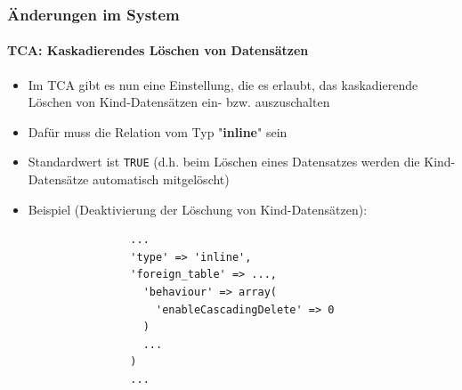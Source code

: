 
\begin{frame}[fragile]
	\frametitle{Änderungen im System}
	\framesubtitle{TCA: Kaskadierendes Löschen von Datensätzen}

	\lstset{
		basicstyle=\tiny\ttfamily
	}

	\begin{itemize}
		\item Im TCA gibt es nun eine Einstellung, die es erlaubt, das kaskadierende Löschen von Kind-Datensätzen
ein- bzw. auszuschalten
		\item Dafür muss die Relation vom Typ "\textbf{inline}" sein
		\item Standardwert ist \texttt{TRUE}\newline
			\small(d.h. beim Löschen eines Datensatzes werden die Kind-Datensätze automatisch mitgelöscht)\normalsize
		\item Beispiel (Deaktivierung der Löschung von Kind-Datensätzen):

			\begin{lstlisting}
				...
				'type' => 'inline',
				'foreign_table' => ...,
				  'behaviour' => array(
				    'enableCascadingDelete' => 0
				  )
				  ...
				)
				...
			\end{lstlisting}

	\end{itemize}

\end{frame}


